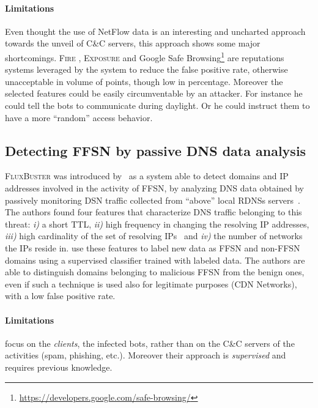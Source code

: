 \paragraph{Limitations} Even thought the use of NetFlow data is an interesting and
uncharted approach towards the unveil of C\&C servers, this approach shows some major
shortcomings. \textsc{Fire} \cite{stone2009fire}, \textsc{Exposure} \cite{bilge2011exposure} and Google Safe Browsing\footnote{\url{https://developers.google.com/safe-browsing/}} are reputations systems leveraged by the system to reduce the false positive rate,
otherwise unacceptable in volume of points, though low in percentage. Moreover the
selected features could be easily circumventable by an attacker. For instance he
could tell the bots to communicate during daylight. Or he could instruct them
to have a more ``random'' access behavior.

\subsection{Detecting FFSN by passive DNS data analysis} %
\label{sub:early_detection_of_malicious_flux_networks_via_large_scale_passive_dns_traffic_analysis}

\textsc{FluxBuster} was introduced by~\citet{perdisci2012} as a system able to detect
domains and IP addresses involved in the activity of FFSN, by analyzing DNS data
obtained by passively monitoring DSN traffic collected from ``above'' local RDNSs
servers~\cite{perdisci2012}.
The authors found four features that characterize DNS traffic belonging to this
threat: \emph{i)} a short TTL, \emph{ii)} high frequency in changing the resolving
IP addresses, \emph{iii)} high cardinality of the set of resolving
IPs~\cite{schiavoni2013} and \emph{iv)} the number of networks the IPs reside in.
\citet{perdisci2012} use these features to label new data as FFSN and non-FFSN
domains using a supervised classifier trained with labeled data.
The authors are able to distinguish domains belonging to malicious FFSN
from the benign ones, even if such a technique is used also for legitimate purposes
(CDN Networks), with a low false positive rate.

\paragraph{Limitations} \citet{perdisci2012} focus on the \emph{clients}, the
infected bots, rather than on the C\&C servers of the activities
(spam, phishing, etc.). Moreover their approach is \emph{supervised} and requires
previous knowledge.

